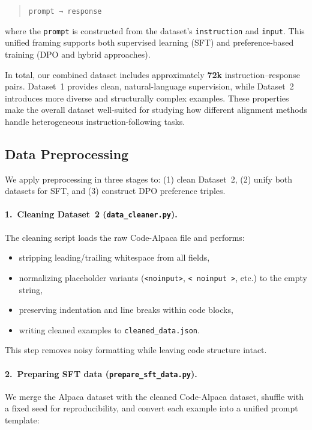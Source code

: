 \documentclass[11pt,a4paper]{article}
\begin{document}
\begin{quote}
\texttt{prompt → response}
\end{quote}

where the \texttt{prompt} is constructed from the dataset’s \texttt{instruction} and \texttt{input}. This unified framing supports both supervised learning (SFT) and preference-based training (DPO and hybrid approaches).

In total, our combined dataset includes approximately \textbf{72k} instruction–response pairs. Dataset~1 provides clean, natural-language supervision, while Dataset~2 introduces more diverse and structurally complex examples. These properties make the overall dataset well-suited for studying how different alignment methods handle heterogeneous instruction-following tasks.

\subsection{Data Preprocessing}

We apply preprocessing in three stages to: (1) clean Dataset~2, (2) unify both datasets for SFT, and (3) construct DPO preference triples.

\paragraph{1.\ Cleaning Dataset~2 (\texttt{data\_cleaner.py}).}
The cleaning script loads the raw Code-Alpaca file and performs:
\begin{itemize}
    \item stripping leading/trailing whitespace from all fields,
    \item normalizing placeholder variants (\texttt{<noinput>}, \texttt{< noinput >}, etc.) to the empty string,
    \item preserving indentation and line breaks within code blocks,
    \item writing cleaned examples to \texttt{cleaned\_data.json}.
\end{itemize}

This step removes noisy formatting while leaving code structure intact.

\paragraph{2.\ Preparing SFT data (\texttt{prepare\_sft\_data.py}).}
We merge the Alpaca dataset with the cleaned Code-Alpaca dataset, shuffle with a fixed seed for reproducibility, and convert each example into a unified prompt template:
\end{document}
